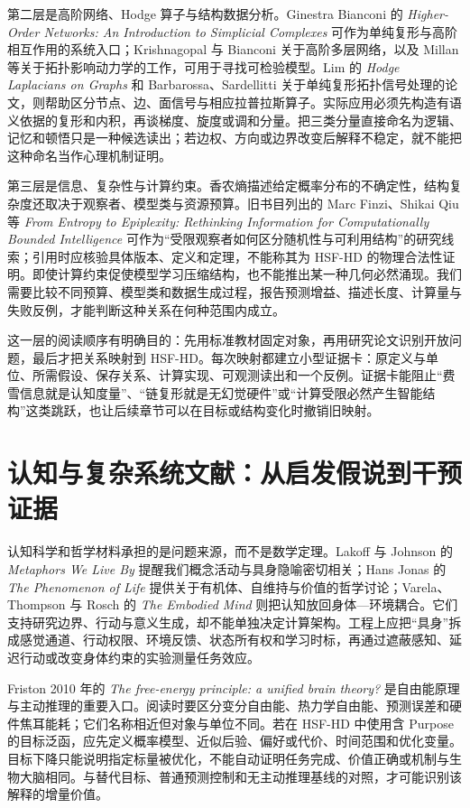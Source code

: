 第二层是高阶网络、Hodge 算子与结构数据分析。Ginestra Bianconi 的 \textit{Higher-Order Networks: An Introduction to Simplicial Complexes} 可作为单纯复形与高阶相互作用的系统入口；Krishnagopal 与 Bianconi 关于高阶多层网络，以及 Millan 等关于拓扑影响动力学的工作，可用于寻找可检验模型。Lim 的 \textit{Hodge Laplacians on Graphs} 和 Barbarossa、Sardellitti 关于单纯复形拓扑信号处理的论文，则帮助区分节点、边、面信号与相应拉普拉斯算子。实际应用必须先构造有语义依据的复形和内积，再谈梯度、旋度或调和分量。把三类分量直接命名为逻辑、记忆和顿悟只是一种候选读出；若边权、方向或边界改变后解释不稳定，就不能把这种命名当作心理机制证明。

第三层是信息、复杂性与计算约束。香农熵描述给定概率分布的不确定性，结构复杂度还取决于观察者、模型类与资源预算。旧书目列出的 Marc Finzi、Shikai Qiu 等 \textit{From Entropy to Epiplexity: Rethinking Information for Computationally Bounded Intelligence} 可作为“受限观察者如何区分随机性与可利用结构”的研究线索；引用时应核验具体版本、定义和定理，不能称其为 HSF-HD 的物理合法性证明。即使计算约束促使模型学习压缩结构，也不能推出某一种几何必然涌现。我们需要比较不同预算、模型类和数据生成过程，报告预测增益、描述长度、计算量与失败反例，才能判断这种关系在何种范围内成立。

这一层的阅读顺序有明确目的：先用标准教材固定对象，再用研究论文识别开放问题，最后才把关系映射到 HSF-HD。每次映射都建立小型证据卡：原定义与单位、所需假设、保存关系、计算实现、可观测读出和一个反例。证据卡能阻止“费雪信息就是认知度量”、“链复形就是无幻觉硬件”或“计算受限必然产生智能结构”这类跳跃，也让后续章节可以在目标或结构变化时撤销旧映射。

\section{认知与复杂系统文献：从启发假说到干预证据}

认知科学和哲学材料承担的是问题来源，而不是数学定理。Lakoff 与 Johnson 的 \textit{Metaphors We Live By} 提醒我们概念活动与具身隐喻密切相关；Hans Jonas 的 \textit{The Phenomenon of Life} 提供关于有机体、自维持与价值的哲学讨论；Varela、Thompson 与 Rosch 的 \textit{The Embodied Mind} 则把认知放回身体—环境耦合。它们支持研究边界、行动与意义生成，却不能单独决定计算架构。工程上应把“具身”拆成感觉通道、行动权限、环境反馈、状态所有权和学习时标，再通过遮蔽感知、延迟行动或改变身体约束的实验测量任务效应。

Friston 2010 年的 \textit{The free-energy principle: a unified brain theory?} 是自由能原理与主动推理的重要入口。阅读时要区分变分自由能、热力学自由能、预测误差和硬件焦耳能耗；它们名称相近但对象与单位不同。若在 HSF-HD 中使用含 Purpose 的目标泛函，应先定义概率模型、近似后验、偏好或代价、时间范围和优化变量。目标下降只能说明指定标量被优化，不能自动证明任务完成、价值正确或机制与生物大脑相同。与替代目标、普通预测控制和无主动推理基线的对照，才可能识别该解释的增量价值。

